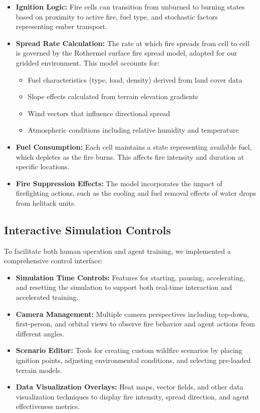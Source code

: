 \documentclass[conference]{IEEEtran}
\begin{document}
\begin{itemize}
    \item \textbf{Ignition Logic:} Fire cells can transition from unburned to burning states based on proximity to active fire, fuel type, and stochastic factors representing ember transport.
    
    \item \textbf{Spread Rate Calculation:} The rate at which fire spreads from cell to cell is governed by the Rothermel surface fire spread model, adapted for our gridded environment. This model accounts for:
    \begin{itemize}
        \item Fuel characteristics (type, load, density) derived from land cover data
        \item Slope effects calculated from terrain elevation gradients
        \item Wind vectors that influence directional spread
        \item Atmospheric conditions including relative humidity and temperature
    \end{itemize}
    
    \item \textbf{Fuel Consumption:} Each cell maintains a state representing available fuel, which depletes as the fire burns. This affects fire intensity and duration at specific locations.
    
    \item \textbf{Fire Suppression Effects:} The model incorporates the impact of firefighting actions, such as the cooling and fuel removal effects of water drops from helitack units.
\end{itemize}

\subsection{Interactive Simulation Controls}
To facilitate both human operation and agent training, we implemented a comprehensive control interface:

\begin{itemize}
    \item \textbf{Simulation Time Controls:} Features for starting, pausing, accelerating, and resetting the simulation to support both real-time interaction and accelerated training.
    
    \item \textbf{Camera Management:} Multiple camera perspectives including top-down, first-person, and orbital views to observe fire behavior and agent actions from different angles.
    
    \item \textbf{Scenario Editor:} Tools for creating custom wildfire scenarios by placing ignition points, adjusting environmental conditions, and selecting pre-loaded terrain models.
    
    \item \textbf{Data Visualization Overlays:} Heat maps, vector fields, and other data visualization techniques to display fire intensity, spread direction, and agent effectiveness metrics.
\end{itemize}
\end{document}
